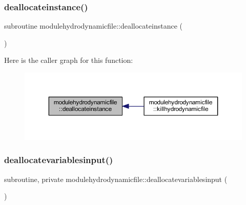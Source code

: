 \subsubsection{\texorpdfstring{deallocateinstance()}{deallocateinstance()}}
{\footnotesize\ttfamily subroutine modulehydrodynamicfile\+::deallocateinstance (\begin{DoxyParamCaption}{ }\end{DoxyParamCaption})\hspace{0.3cm}{\ttfamily [private]}}

Here is the caller graph for this function\+:\nopagebreak
\begin{figure}[H]
\begin{center}
\leavevmode
\includegraphics[width=350pt]{namespacemodulehydrodynamicfile_a66415f6a8626e085fe6327e56b6e0438_icgraph}
\end{center}
\end{figure}
\mbox{\label{namespacemodulehydrodynamicfile_a44ff390b68de3bb94294a2fe2d251814}} 
\subsubsection{\texorpdfstring{deallocatevariablesinput()}{deallocatevariablesinput()}}
{\footnotesize\ttfamily subroutine, private modulehydrodynamicfile\+::deallocatevariablesinput (\begin{DoxyParamCaption}{ }\end{DoxyParamCaption})\hspace{0.3cm}{\ttfamily [private]}}

